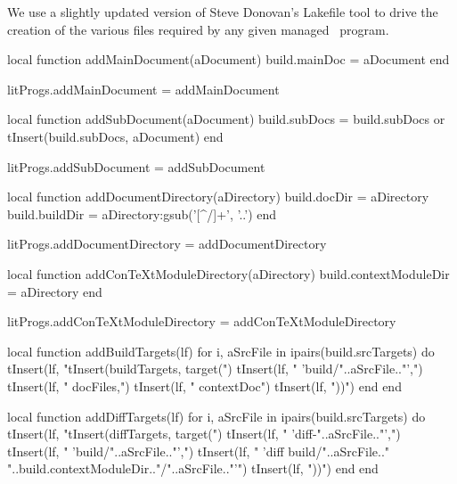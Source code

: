 
\startchapter[title=Lakefile]

We use a slightly updated version of Steve Donovan's Lakefile tool to 
drive the creation of the various files required by any given 
 managed \ConTeXt\ program. 

\startMkIVCode
\def\addMainDocument#1{
  \directlua{
    thirddata.literateProgs.addMainDocument('#1')
  }
}

\def\addSubDocument#1{
  \directlua{
    thirddata.literateProgs.addSubDocument('#1')
  }
}

\def\addDocumentDirectory#1{
  \directlua{
    thirddata.literateProgs.addDocumentDirectory('#1')
  }
}

\def\addConTeXtModuleDirectory#1{
  \directlua{
    thirddata.literateProgs.addConTeXtModuleDirectory('#1')
  }
}
\stopMkIVCode

\startLuaCode
local function addMainDocument(aDocument)
  build.mainDoc = aDocument
end

litProgs.addMainDocument = addMainDocument

local function addSubDocument(aDocument)
  build.subDocs = build.subDocs or { }
  tInsert(build.subDocs, aDocument)
end

litProgs.addSubDocument = addSubDocument

local function addDocumentDirectory(aDirectory)
  build.docDir   = aDirectory
  build.buildDir = aDirectory:gsub('[^/]+', '..')
end

litProgs.addDocumentDirectory = addDocumentDirectory

local function addConTeXtModuleDirectory(aDirectory)
  build.contextModuleDir = aDirectory
end

litProgs.addConTeXtModuleDirectory = addConTeXtModuleDirectory
\stopLuaCode

\startMkIVCode
\def\compileLakefile#1{
  \directlua{
    thirddata.literateProgs.compileLakefile('#1')
  }
}
\stopMkIVCode

\startLuaCode
local function addBuildTargets(lf)
  for i, aSrcFile in ipairs(build.srcTargets) do
    tInsert(lf, "tInsert(buildTargets, target(")
    tInsert(lf, "  'build/"..aSrcFile.."',")
    tInsert(lf, "  docFiles,")
    tInsert(lf, "  contextDoc")
    tInsert(lf, "))\n")
  end
end

local function addDiffTargets(lf)
  for i, aSrcFile in ipairs(build.srcTargets) do
    tInsert(lf, "tInsert(diffTargets, target(")
    tInsert(lf, "  'diff-"..aSrcFile.."',")
    tInsert(lf, "  'build/"..aSrcFile.."',")
    tInsert(lf, "  'diff build/"..aSrcFile.." "..build.contextModuleDir.."/"..aSrcFile.."'")
    tInsert(lf, "))\n")
  end
end


